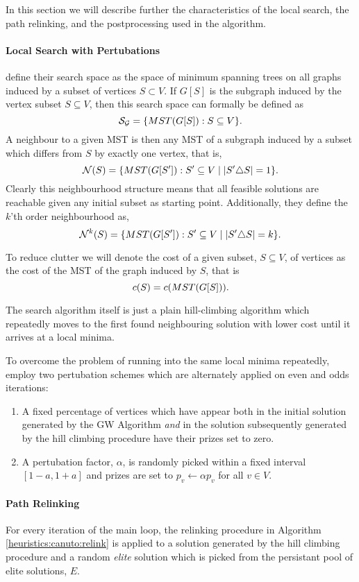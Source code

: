  In this section we will
 describe further the characteristics of the local search, the
 path relinking, and the postprocessing used in the algorithm.
\paragraph{Local Search with Pertubations}
\cite{canuto2001local} define their search space as the space of minimum spanning
trees on all graphs induced by a subset of vertices
 $S \subset V$. If $G[S]$ is the subgraph induced by the vertex subset $S \subseteq V$, then
 this search space can formally be defined as
$$\mathcal{S_G} = \{MST(G[S]) : S \subseteq V \}\mathnormal{.}$$
A neighbour to a given MST is then any MST of a subgraph induced by a subset which differs from $S$
 by exactly one vertex, that is,
$$\mathcal{N}(S) = \{MST(G[S']) : S' \subseteq V \mid |S' \triangle S| = 1 \}\mathnormal{.}$$ 
Clearly this neighbourhood structure means that all feasible solutions are reachable
given any initial subset as starting point. Additionally, they define the
$k$'th order neighbourhood as,
$$\mathcal{N}^k(S) = \{MST(G[S']) : S' \subseteq V \mid |S' \triangle S| = k \}\mathnormal{.}$$ 

To reduce clutter we will denote the cost
of a given subset, $S \subseteq V$, of vertices as the cost
of the MST of the graph induced by $S$, that is
$$c(S) = c(MST(G[S]))\mathnormal{.}$$

The search algorithm itself is just a plain hill-climbing algorithm which repeatedly
 moves to the first
 found neighbouring solution with lower cost until it arrives at a local minima.

 To overcome the problem of running into the same local minima repeatedly,
 \cite{canuto2001local} employ two pertubation schemes which are alternately applied
 on even and odds iterations:
 \begin{enumerate}
 \item A fixed percentage of vertices which have appear both in the initial solution generated
   by the GW Algorithm \textit{and}  in the solution subsequently generated by
    the hill climbing procedure have their prizes
    set to zero.
  \item A pertubation factor, $\alpha$, is randomly picked within a fixed interval $[1 -a, 1+a]$
    and prizes are set to $p_v \gets \alpha p_v$ for all $v \in V$.
 \end{enumerate}

\paragraph{Path Relinking}
For every iteration of the main loop, the relinking procedure in Algorithm \ref{heuristics:canuto:relink}
is applied to a solution generated by the hill climbing procedure and 
a random \textit{elite} solution which is picked from the
persistant pool of elite solutions, $E$.

